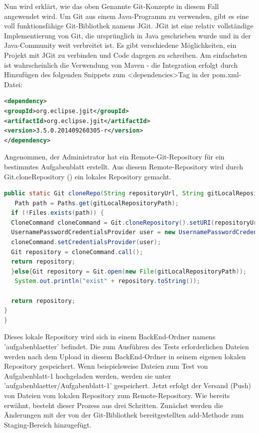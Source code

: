 \documentclass[a4paper,12pt,oneside]{book}
\begin{document}
Nun wird erklärt, wie das oben Genannte Git-Konzepte in diesem Fall angewendet wird. 
\newline
Um Git aus einem Java-Programm zu verwenden, gibt es eine voll funktionsfähige Git-Bibliothek namens JGit. JGit ist eine relativ vollständige Implementierung von Git, die ursprünglich in Java geschrieben wurde und in der Java-Community weit verbreitet ist.
Es gibt verschiedene Möglichkeiten, ein Projekt mit JGit zu verbinden und Code dagegen zu schreiben. Am einfachsten ist wahrscheinlich die Verwendung von Maven - die Integration erfolgt durch Hinzufügen des folgenden Snippets zum <dependencies>Tag in der pom.xml-Datei:
\begin{lstlisting}[language=XML,caption=JGit-dependency ]
<dependency>
<groupId>org.eclipse.jgit</groupId>
<artifactId>org.eclipse.jgit</artifactId>
<version>3.5.0.201409260305-r</version>
</dependency>
\end{lstlisting} 
Angenommen, der Administrator hat ein Remote-Git-Repository für ein bestimmtes Aufgabenblatt erstellt. Aus diesem Remote-Repository wird durch Git.cloneRepository () ein lokales Repository gemacht.
\begin{lstlisting}[language=JAVA,caption=clone Repository ]
public static Git cloneRepo(String repositoryUrl, String gitLocalRepositoryPath, String tfsUser, String password) throws GitAPIException, IOException {
   Path path = Paths.get(gitLocalRepositoryPath);
  if (!Files.exists(path)) {
  CloneCommand cloneCommand = Git.cloneRepository().setURI(repositoryUrl).setDirectory(new File(gitLocalRepositoryPath));
  UsernamePasswordCredentialsProvider user = new UsernamePasswordCredentialsProvider(tfsUser, password);
  cloneCommand.setCredentialsProvider(user);
  Git repository = cloneCommand.call();
  return repository;
  }else{Git repository = Git.open(new File(gitLocalRepositoryPath));
   System.out.println("exist" + repository.toString());

  return repository;
}
}
\end{lstlisting} 
Dieses lokale Repository wird sich in einem BackEnd-Ordner namens 'aufgabenblaetter' befindet. Die zum Ausführen des Tests erforderlichen Dateien werden nach dem Upload in diesem BackEnd-Ordner in seinem eigenen lokalen Repository gespeichert. Wenn beispielsweise Dateien zum Test von Aufgabenblatt-1 hochgeladen werden, werden sie unter 'aufgabenblaetter/Aufgabenblatt-1' gespeichert.
\newline
Jetzt erfolgt der Versand (Push) von Dateien vom lokalen Repository zum Remote-Repository. Wie bereits erwähnt, besteht dieser Prozess aus drei Schritten. Zunächst werden die Änderungen mit der von der Git-Bibliothek bereitgestellten add-Methode zum Staging-Bereich hinzugefügt.
\end{document}
